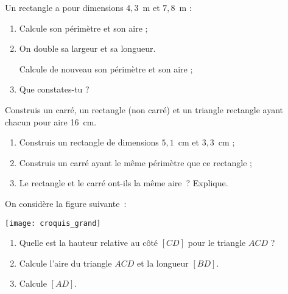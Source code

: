 \begin{exercice}[Agrandissement]
Un rectangle a pour dimensions $4,3$ m et $7,8$ m :
\begin{enumerate}
 \item Calcule son périmètre et son aire ;
 \item On double sa largeur et sa longueur.
 
Calcule de nouveau son périmètre et son aire ;
 \item Que constates-tu ?
 \end{enumerate}
\end{exercice}


\begin{exercice}
Construis un carré, un rectangle (non carré) et un triangle rectangle ayant chacun pour aire 16 cm.
\end{exercice}


\begin{exercice}
\begin{enumerate}
 \item Construis un rectangle de dimensions $5,1$ cm et $3,3$ cm ;
 \item Construis un carré ayant le même périmètre que ce rectangle ;
 \item Le rectangle et le carré ont-ils la même aire ? Explique.
 \end{enumerate}
\end{exercice}


\begin{exercice}
On considère la figure suivante :
\begin{center} \texttt{[image: croquis\_grand]} \end{center}
\begin{enumerate}
 \item Quelle est la hauteur relative au côté $[CD]$ pour le triangle $ACD$ ?
 \item Calcule l'aire du triangle $ACD$ et la longueur $[BD]$.
 \item Calcule $[AD]$.
 \end{enumerate}
\end{exercice}



\newpage




